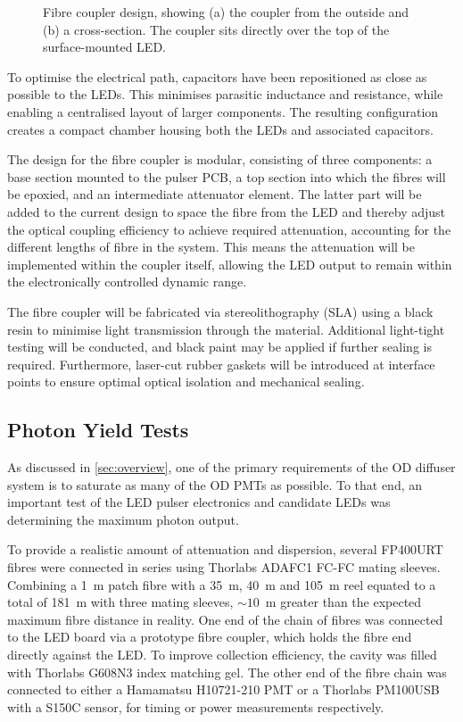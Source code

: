 \documentclass[a4paper,11pt]{article}
\let\oldsim\sim
\renewcommand{\sim}{{\oldsim}}
\begin{document}
\begin{figure}[h!]
\begin{subfigure}{0.5\textwidth}
        \subcaption{}\label{fig:oldFibreCouplerHalf}
\end{subfigure}
\caption{Fibre coupler design, showing (a) the coupler from the outside and (b) a cross-section. The coupler sits directly over the top of the surface-mounted LED.\label{fig:OldFibreCouplerDesign}}
\end{figure}

To optimise the electrical path, capacitors have been repositioned as close as possible to the LEDs. This minimises parasitic inductance and resistance, while enabling a centralised layout of larger components. The resulting configuration creates a compact chamber housing both the LEDs and associated capacitors.

The design for the fibre coupler is modular, consisting of three components: a base section mounted to the pulser PCB, a top section into which the fibres will be epoxied, and an intermediate attenuator element. The latter part will be added to the current design to space the fibre from the LED and thereby adjust the optical coupling efficiency to achieve required attenuation, accounting for the different lengths of fibre in the system. This means the attenuation will be implemented within the coupler itself, allowing the LED output to remain within the electronically controlled dynamic range.

The fibre coupler will be fabricated via stereolithography (SLA) using a black resin to minimise light transmission through the material. Additional light-tight testing will be conducted, and black paint may be applied if further sealing is required. Furthermore, laser-cut rubber gaskets will be introduced at interface points to ensure optimal optical isolation and mechanical sealing.

\subsection{Photon Yield Tests}

As discussed in \cref{sec:overview}, one of the primary requirements of the OD diffuser system is to saturate as many of the OD PMTs as possible. To that end, an important test of the LED pulser electronics and candidate LEDs was determining the maximum photon output.

To provide a realistic amount of attenuation and dispersion, several FP400URT fibres were connected in series using Thorlabs ADAFC1 FC-FC mating sleeves. Combining a 1~m patch fibre with a 35~m, 40~m and 105~m reel equated to a total of 181~m with three mating sleeves, $\sim10$~m greater than the expected maximum fibre distance in reality. One end of the chain of fibres was connected to the LED board via a prototype fibre coupler, which holds the fibre end directly against the LED. To improve collection efficiency, the cavity was filled with Thorlabs G608N3 index matching gel. The other end of the fibre chain was connected to either a Hamamatsu H10721-210 PMT or a Thorlabs PM100USB with a S150C sensor, for timing or power measurements respectively.
\end{document}
